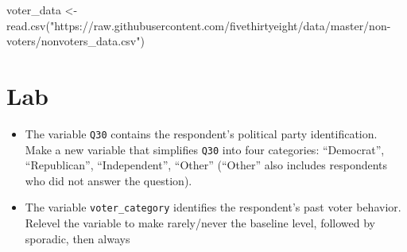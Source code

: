\documentclass[
  letterpaper,
  DIV=11,
  numbers=noendperiod]{scrartcl}
\newenvironment{Shaded}{\begin{snugshade}}{\end{snugshade}}
\newcommand{\AttributeTok}[1]{\textcolor[rgb]{0.40,0.45,0.13}{#1}}
\newcommand{\CommentTok}[1]{\textcolor[rgb]{0.37,0.37,0.37}{#1}}
\newcommand{\ConstantTok}[1]{\textcolor[rgb]{0.56,0.35,0.01}{#1}}
\newcommand{\DecValTok}[1]{\textcolor[rgb]{0.68,0.00,0.00}{#1}}
\newcommand{\FunctionTok}[1]{\textcolor[rgb]{0.28,0.35,0.67}{#1}}
\newcommand{\NormalTok}[1]{\textcolor[rgb]{0.00,0.23,0.31}{#1}}
\newcommand{\OtherTok}[1]{\textcolor[rgb]{0.00,0.23,0.31}{#1}}
\newcommand{\SpecialCharTok}[1]{\textcolor[rgb]{0.37,0.37,0.37}{#1}}
\newcommand{\StringTok}[1]{\textcolor[rgb]{0.13,0.47,0.30}{#1}}
\providecommand{\tightlist}{%
  \setlength{\itemsep}{0pt}\setlength{\parskip}{0pt}}\usepackage{longtable,booktabs,array}
\begin{document}
\begin{Shaded}
\begin{Highlighting}[]
\NormalTok{voter\_data }\OtherTok{\textless{}{-}} \FunctionTok{read.csv}\NormalTok{(}\StringTok{"https://raw.githubusercontent.com/fivethirtyeight/data/master/non{-}voters/nonvoters\_data.csv"}\NormalTok{)}
\end{Highlighting}
\end{Shaded}

\section{Lab}\label{lab}

\begin{itemize}
\tightlist
\item
  The variable \texttt{Q30} contains the respondent's political party
  identification. Make a new variable that simplifies \texttt{Q30} into
  four categories: ``Democrat'', ``Republican'', ``Independent'',
  ``Other'' (``Other'' also includes respondents who did not answer the
  question).
\end{itemize}

\begin{Shaded}
\end{Shaded}

\begin{itemize}
\tightlist
\item
  The variable \texttt{voter\_category} identifies the respondent's past
  voter behavior. Relevel the variable to make rarely/never the baseline
  level, followed by sporadic, then always
\end{itemize}
\end{document}
